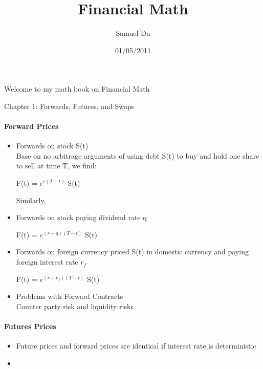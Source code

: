 \documentclass[12pt]{article}
\title{Financial Math}
\author{Samuel Du}
\date{01/05/2011}
\begin{document}
\maketitle

Welcome to my math book on Financial Math


Chapter 1: Forwards, Futures, and Swaps
\paragraph{Forward Prices}
\begin{itemize}
	\item Forwards on stock S(t)\\
	Base on no arbitrage arguments of using debt S(t) to buy and hold one share to sell at time T, we find:

 \begin{center} F(t) = ${e^{r(T-t)}}$ S(t) \end{center}
 
 Similarly,
 
 \item Forwards on stock paying dividend rate q
 
 \begin{center} F(t) = ${e^{(r-q)(T-t)}}$ S(t) \end{center}
 
 \item Forwards on foreign currency priced S(t) in domestic currency and paying foreign interest rate ${r_f}$
 	\begin{center} F(t) = ${e^{(r-r_f)(T-t)}}$ S(t) \end{center}
 	
 \item Problems with Forward Contracts \\
 	Counter party risk and liquidity risks
 \end{itemize}

\paragraph{Futures Prices}

 
\begin{itemize}
	\item Future prices and forward prices are identical if interest rate is deterministic
	\item 
  
\end{itemize}
\end{document}

